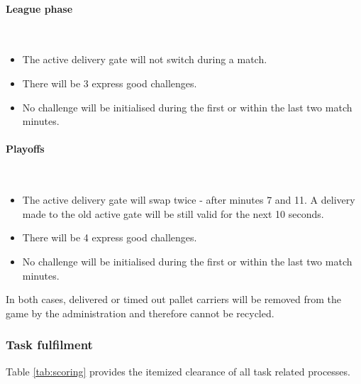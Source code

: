 \documentclass[12pt,twoside]{article}
\begin{document}
\paragraph{League phase}~\\
\begin{itemize}
\item The active delivery gate will not switch during a match.
\item There will be 3 express good challenges.
\item No challenge will be initialised during the first or within the
  last two match minutes.
\end{itemize} 

\paragraph{Playoffs}~\\
\begin{itemize}
\item The active delivery gate will swap twice - after minutes 7
  and 11. A delivery made to the old active gate will be still
  valid for the next 10 seconds.
\item There will be 4 express good challenges. 
\item No challenge will be initialised during the first or within
  the last two match minutes.
\end{itemize}
     

In both cases, delivered or timed out pallet carriers will be removed
from the game by the administration and therefore cannot be recycled.

\subsubsection{Task fulfilment}

Table \ref{tab:scoring} provides the itemized clearance of all task
related processes.
\end{document}
